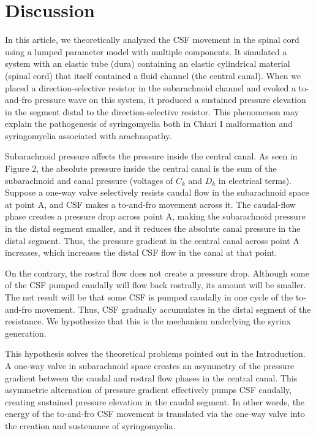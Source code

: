 \documentclass[fleqn,10pt]{wlscirep}
\begin{document}
\section*{Discussion}

In this article, we theoretically analyzed the CSF movement in the spinal
cord using a lumped parameter model with multiple components. It simulated
a system with an elastic tube (dura) containing an elastic cylindrical
material (spinal cord) that itself contained a fluid channel (the central
canal). When we placed a direction-selective resistor in the subarachnoid
channel and evoked a to-and-fro pressure wave on this system, it produced a
sustained pressure elevation in the segment distal to the
direction-selective resistor. This phenomenon may explain the pathogenesis
of syringomyelia both in Chiari I malformation and syringomyelia associated
with arachnopathy.

Subarachnoid pressure affects the pressure inside the central canal. As
seen in Figure 2, the absolute pressure inside the central canal is the sum
of the subarachnoid and canal pressure (voltages of $C_k$ and $D_k$ in
electrical terms). Suppose a one-way valve selectively resists caudal flow
in the subarachnoid space at point A, and CSF makes a to-and-fro movement
across it. The caudal-flow phase creates a pressure drop across point A,
making the subarachnoid pressure in the distal segment smaller, and it
reduces the absolute canal pressure in the distal segment. Thus, the
pressure gradient in the central canal across point A increases, which
increases the distal CSF flow in the canal at that point.

On the contrary, the rostral flow does not create a pressure drop. Although
some of the CSF pumped caudally will flow back rostrally, its amount will
be smaller. The net result will be that some CSF is pumped caudally in one
cycle of the to-and-fro movement. Thus, CSF gradually accumulates in the
distal segment of the resistance. We hypothesize that this is the mechanism
underlying the syrinx generation.

This hypothesis solves the theoretical problems pointed out in the
Introduction. A one-way valve in subarachnoid space creates an asymmetry of
the pressure gradient between the caudal and rostral flow phases in the
central canal. This asymmetric alternation of pressure gradient effectively
pumps CSF caudally, creating sustained pressure elevation in the caudal
segment. In other words, the energy of the to-and-fro CSF movement is
translated via the one-way valve into the creation and sustenance of
syringomyelia.
\end{document}
